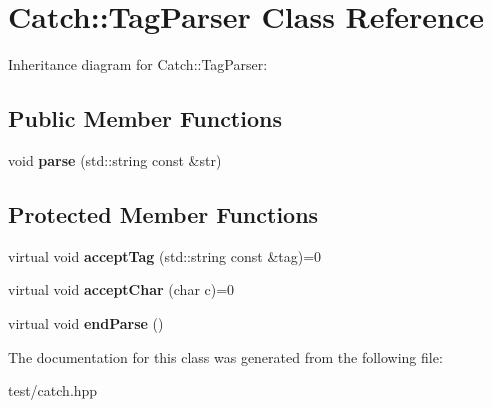 \hypertarget{classCatch_1_1TagParser}{}\section{Catch\+:\+:Tag\+Parser Class Reference}
\label{classCatch_1_1TagParser}


Inheritance diagram for Catch\+:\+:Tag\+Parser\+:
\subsection*{Public Member Functions}
\begin{DoxyCompactItemize}
\item 
void {\bfseries parse} (std\+::string const \&str)\hypertarget{classCatch_1_1TagParser_afc37c4ca179f183d1fa46e703acd244f}{}\label{classCatch_1_1TagParser_afc37c4ca179f183d1fa46e703acd244f}

\end{DoxyCompactItemize}
\subsection*{Protected Member Functions}
\begin{DoxyCompactItemize}
\item 
virtual void {\bfseries accept\+Tag} (std\+::string const \&tag)=0\hypertarget{classCatch_1_1TagParser_ad10e947a1e3e23df86cf5d2e7f8ac86b}{}\label{classCatch_1_1TagParser_ad10e947a1e3e23df86cf5d2e7f8ac86b}

\item 
virtual void {\bfseries accept\+Char} (char c)=0\hypertarget{classCatch_1_1TagParser_a39660c883ef0dc71fc79f067b2832a27}{}\label{classCatch_1_1TagParser_a39660c883ef0dc71fc79f067b2832a27}

\item 
virtual void {\bfseries end\+Parse} ()\hypertarget{classCatch_1_1TagParser_ac26ddd9fe8289b13058bb3e96cc6027a}{}\label{classCatch_1_1TagParser_ac26ddd9fe8289b13058bb3e96cc6027a}

\end{DoxyCompactItemize}


The documentation for this class was generated from the following file\+:\begin{DoxyCompactItemize}
\item 
test/catch.\+hpp\end{DoxyCompactItemize}
